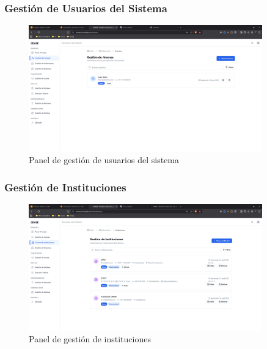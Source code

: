 \documentclass[12pt,a4paper]{article}
\begin{document}
\begin{enumerate}
\subsubsection{Gestión de Usuarios del Sistema}
\begin{figure}[H]
    \centering
    \includegraphics[width=0.9\textwidth]{screenshots/admin/user-management.png}
    \caption{Panel de gestión de usuarios del sistema}
    \label{fig:admin-users}
\end{figure}

\subsubsection{Gestión de Instituciones}
\begin{figure}[H]
    \centering
    \includegraphics[width=0.9\textwidth]{screenshots/admin/institution-management.png}
    \caption{Panel de gestión de instituciones}
    \label{fig:admin-institutions}
\end{figure}


\end{enumerate}
\end{document}
